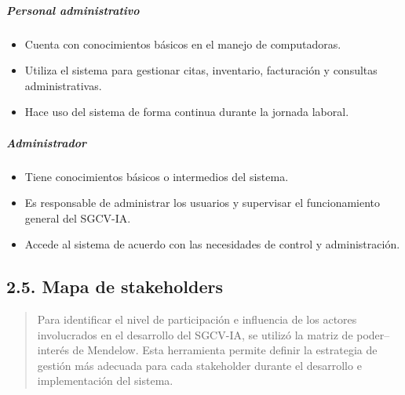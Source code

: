 \documentclass[
]{article}
\begin{document}
\subparagraph{Personal administrativo}\label{personal-administrativo}

\begin{itemize}
\item
  Cuenta con conocimientos básicos en el manejo de computadoras.
\item
  Utiliza el sistema para gestionar citas, inventario, facturación y
  consultas administrativas.
\item
  Hace uso del sistema de forma continua durante la jornada laboral.
\end{itemize}

\subparagraph{Administrador}\label{administrador}

\begin{itemize}
\item
  Tiene conocimientos básicos o intermedios del sistema.
\item
  Es responsable de administrar los usuarios y supervisar el
  funcionamiento general del SGCV-IA.
\item
  Accede al sistema de acuerdo con las necesidades de control y
  administración.
\end{itemize}

\subsection{2.5. Mapa de stakeholders}\label{mapa-de-stakeholders}

\begin{quote}
Para identificar el nivel de participación e influencia de los actores
involucrados en el desarrollo del SGCV-IA, se utilizó la matriz de
poder--interés de Mendelow. Esta herramienta permite definir la
estrategia de gestión más adecuada para cada stakeholder durante el
desarrollo e implementación del sistema.
\end{quote}
\end{document}
